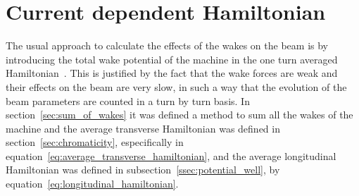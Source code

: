 \section{Current dependent Hamiltonian}

    The usual approach to calculate the effects of the wakes on the beam is by introducing the total wake potential of the machine in the one turn averaged Hamiltonian~\cite{Berg1996,Lindberg2016}. This is justified by the fact that the wake forces are weak and their effects on the beam are very slow, in such a way that the evolution of the beam parameters are counted in a turn by turn basis. In section~\ref{sec:sum_of_wakes} it was defined a method to sum all the wakes of the machine and the average transverse Hamiltonian was defined in section~\ref{sec:chromaticity}, especifically in equation~\eqref{eq:average_transverse_hamiltonian}, and the average longitudinal Hamiltonian was defined in subsection~\ref{ssec:potential_well}, by equation~\eqref{eq:longitudinal_hamiltonian}.

